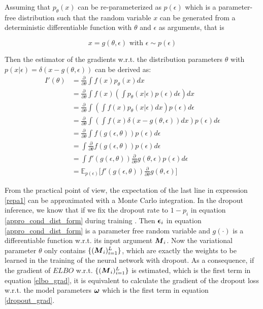 Assuming that $p_{\theta}(x)$ can be re-parameterized as $p(\epsilon)$ which is a parameter-free distribution such that the random variable $x$ can be generated from a deterministic differentiable function with $\theta$ and $\epsilon$ as arguments, that is

\[
x = g(\theta, \epsilon)  \text{ with } \epsilon \sim p(\epsilon)
\]

Then the estimator of the gradients w.r.t. the distribution parameters $\theta$ with $p(x|\epsilon) = \delta(x-g(\theta,\epsilon))$ can be derived as:
\begin{equation}
\begin{aligned} \label{repa1}
I'(\theta) &= \frac{\partial}{\partial \theta} \int f(x) p_{\theta}(x) dx \\
&= \frac{\partial}{\partial \theta} \int f(x)(\int p_{\theta}(x|\epsilon)p(\epsilon)d\epsilon) dx \\
&= \frac{\partial}{\partial \theta} \int (\int f(x) p_{\theta}(x|\epsilon)dx) p(\epsilon) d\epsilon \\
&= \frac{\partial}{\partial \theta} \int (\int f(x)\delta(x-g(\theta,\epsilon))dx) p(\epsilon) d\epsilon \\ 
&= \frac{\partial}{\partial \theta} \int f(g(\epsilon, \theta)) p(\epsilon) d\epsilon \\
&= \int \frac{\partial}{\partial \theta} f(g(\epsilon, \theta)) p(\epsilon) d\epsilon \\
&= \int f'(g(\epsilon, \theta))\frac{\partial}{\partial \theta}g(\theta, \epsilon) p(\epsilon) d\epsilon \\
&= \mathbb E_{p(\epsilon)}\big[ f'(g(\epsilon, \theta))\frac{\partial}{\partial \theta}g(\theta, \epsilon)\big] 
\end{aligned}
\end{equation} 

From the practical point of view, the expectation of the last line in expression \ref{repa1} can be approximated with a Monte Carlo integration. 
In the dropout inference, we know that if we fix the dropout rate to $1- p_{i}$ in equation \ref{appro_cond_dist_form} during training . 
Then $\boldsymbol \epsilon_{i}$ in equation \ref{appro_cond_dist_form} is a parameter free random variable and $g(\cdot)$ is a differentiable function w.r.t. its input argument $\boldsymbol M_{i}$. Now the variational parameter $\theta$ only contains $\{(\boldsymbol M_{i})_{i=1}^{L} \}$, which are exactly the weights to be learned in the training of the neural network with dropout. As a consequence, if the gradient of $ELBO$ w.r.t. $\{(\boldsymbol M_{i})_{i=1}^{L}\}$ is estimated, which is the first term in equation \ref{elbo_grad}, it is equivalent to calculate the gradient of the dropout loss w.r.t. the model parameters $\boldsymbol \omega$ which is the first term in equation \ref{dropout_grad}.

